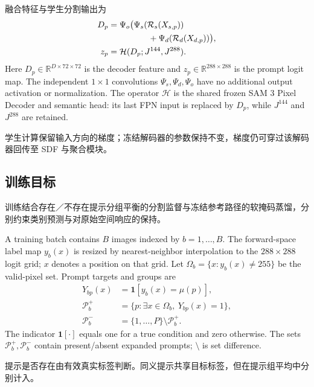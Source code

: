 融合特征与学生分割输出为
\begin{equation}
\begin{aligned}
 D_p={}&\Psi_o\bigl(\Psi_s(\mathcal R_s(X_{s,p}))\\
       &\hspace{3.4em}+\Psi_d(\mathcal R_d(X_{d,p}))\bigr),\\
 z_p={}&\mathcal H(D_p;J^{144},J^{288}).
\end{aligned}
\label{eq:sdf_decode}
\end{equation}
Here $D_p\in\mathbb R^{D\times72\times72}$ is the decoder feature and $z_p\in\mathbb R^{288\times288}$ is the prompt logit map. The independent $1\times1$ convolutions $\Psi_s,\Psi_d,\Psi_o$ have no additional output activation or normalization. The operator $\mathcal H$ is the shared frozen SAM 3 Pixel Decoder and semantic head: its last FPN input is replaced by $D_p$, while $J^{144}$ and $J^{288}$ are retained.

学生计算保留输入方向的梯度；冻结解码器的参数保持不变，梯度仍可穿过该解码器回传至 SDF 与聚合模块。

\subsection{训练目标}
训练结合存在／不存在提示分组平衡的分割监督与冻结参考路径的软掩码蒸馏，分别约束类别预测与对原始空间响应的保持。

A training batch contains $B$ images indexed by $b=1,\ldots,B$. The forward-space label map $y_b(x)$ is resized by nearest-neighbor interpolation to the $288\times288$ logit grid; $x$ denotes a position on that grid. Let $\Omega_b=\{x:y_b(x)\ne255\}$ be the valid-pixel set. Prompt targets and groups are
\begin{equation}
\begin{aligned}
 Y_{bp}(x)&=\mathbf 1[y_b(x)=\mu(p)],\\
 \mathcal P_b^+&=\{p:\exists x\in\Omega_b,\ Y_{bp}(x)=1\},\\
 \mathcal P_b^-&=\{1,\ldots,P\}\setminus\mathcal P_b^+.
\end{aligned}
\label{eq:supervision_sets}
\end{equation}
The indicator $\mathbf 1[\cdot]$ equals one for a true condition and zero otherwise. The sets $\mathcal P_b^+,\mathcal P_b^-$ contain present/absent expanded prompts; $\setminus$ is set difference.

提示是否存在由有效真实标签判断。同义提示共享目标标签，但在提示组平均中分别计入。

